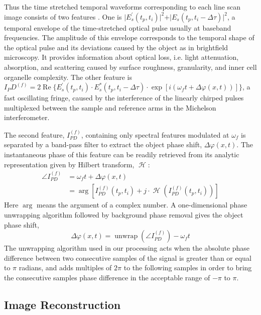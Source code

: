 \documentclass[aps,pra,reprint,superscriptaddress]{revtex4-1}
\DeclareMathOperator{\hilbert}{\mathcal{H}} %
\DeclareMathOperator{\unwrap}{unwrap} %
\begin{document}
Thus the time stretched temporal waveforms corresponding to each line scan image consists of two features \cite{mahjoubfar2014label}. One is $\rvert E_s^\prime(t_p,t_i) \lvert^2 + \rvert E_s(t_p,t_i-\Delta\tau) \lvert^2$, a temporal envelope of the time-stretched optical pulse usually at baseband frequencies. The amplitude of this envelope corresponds to the temporal shape of the optical pulse and its deviations caused by the object as in brightfield microscopy. It provides information about optical loss, i.e. light attenuation, absorption, and scattering caused by surface roughness, granularity, and inner cell organelle complexity. The other feature is $I_PD^{(f)} = 2 \operatorname{Re}\lbrace E_s^\prime(t_p,t_i) \cdot E_s^*(t_p,t_i-\Delta\tau) \cdot \exp[i(\omega_f t + \Delta\varphi(x,t))] \rbrace$, a fast oscillating fringe, caused by the interference of the linearly chirped pulses multiplexed between the sample and reference arms in the Michelson interferometer.

The second feature, $I_{PD}^{(f)}$, containing only spectral features modulated at $\omega_f$ is separated by a band-pass filter to extract the object phase shift, $\Delta\varphi(x,t)$. The instantaneous phase of this feature can be readily retrieved from its analytic representation given by Hilbert transform, $\hilbert$:
\begin{align}
\angle I_{PD}^{(f)} &= \omega_f t + \Delta\varphi(x,t) \\
&= \arg[I_{PD}^{(f)} (t_p,t_i ) + j \cdot \hilbert(I_{PD}^{(f)}(t_p,t_i))]
\end{align}
Here $\arg$ means the argument of a complex number. A one-dimensional phase unwrapping algorithm followed by background phase removal gives the object phase shift, 
\begin{equation}
\Delta\varphi(x,t) = \unwrap(\angle I_{PD}^{(f)}) - \omega_f t
\end{equation}
The unwrapping algorithm used in our processing acts when the absolute phase difference between two consecutive samples of the signal is greater than or equal to $\pi$ radians, and adds multiples of $2\pi$ to the following samples in order to bring the consecutive samples phase difference in the acceptable range of $-\pi$ to $\pi$.

\subsection{Image Reconstruction}
\end{document}
